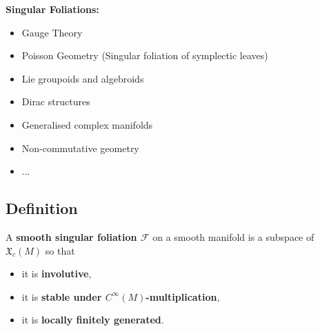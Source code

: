 \documentclass[hyperref={pdfpagelabels=false}]{beamer}
\newcommand\insertreferences{}
\theoremstyle{plain}
\theoremstyle{remark}
\begin{document}
{\begin{frame}
\end{frame}
}

{
\begin{frame}
\textbf{Singular Foliations:}

\begin{itemize}
	\item Gauge Theory
	\item Poisson Geometry \newline (Singular foliation of symplectic leaves)
	\item Lie groupoids and algebroids
	\item Dirac structures
	\item Generalised complex manifolds
	\item Non-commutative geometry
	\item $\dotsc$
\end{itemize}

\end{frame}
}

\renewcommand\insertreferences{{\tiny  Peter Stefan, Accessible sets, orbits, and foliations with singularities. \textit{Proc.\ London Math.\ Soc.}, 29, 1974.
\newline
Héctor J. Sussmann, Orbits of families of vector fields and integrability of distributions. \textit{Trans.\ Amer.\ Math.\ Soc.}, 180, 1973}}

\subsection{Definition}

\begin{frame}
\begin{definition}
A \textbf{smooth singular foliation $\mathcal{F}$} on a smooth manifold is a subspace of $\mathfrak{X}_c(M)$ so that
\begin{itemize}
	\item it is \textbf{involutive},
	\item it is \textbf{stable under $C^\infty(M)$-multiplication},
	\item it is \textbf{locally finitely generated}.
\end{itemize}
\end{definition}
\end{frame}
\end{document}
